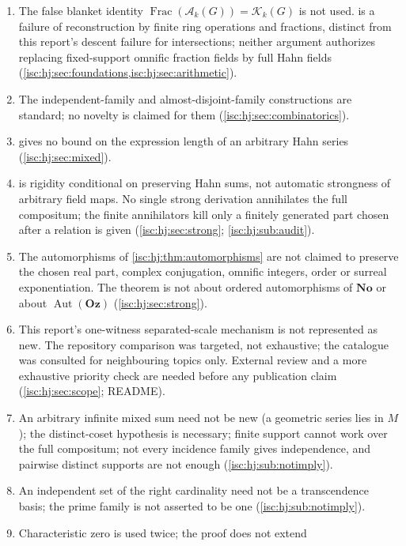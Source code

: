 \documentclass[11pt,letterpaper]{article}
\theoremstyle{definition}
\theoremstyle{remark}
\newcommand{\No}{\mathbf{No}}
\newcommand{\Oz}{\mathbf{Oz}}
\newcommand{\K}[2]{\mathcal K_{#1}(#2)}
\newcommand{\A}[2]{\mathcal A_{#1}(#2)}
\newcommand{\Frac}{\operatorname{Frac}}
\numberwithin{equation}{section}
\begin{document}
\begin{enumerate}[label=J\arabic*.,leftmargin=2.6em,itemsep=2pt]
They are not the Berarducci--Mantova derivation and are not assumed to
respect a surreal exponential (\cref{isc:hj:sec:foundations}).
\item The false blanket identity $\Frac(\A{k}{G})=\K{k}{G}$ is not used.
 is a failure of reconstruction by finite ring
operations and fractions, distinct from this report's descent failure for
intersections; neither argument authorizes replacing fixed-support omnific
fraction fields by full Hahn fields (\cref{isc:hj:sec:foundations,isc:hj:sec:arithmetic}).
\item The independent-family and almost-disjoint-family constructions are
standard; no novelty is claimed for them (\cref{isc:hj:sec:combinatorics}).
\item {} gives no bound on the expression
length of an arbitrary Hahn series (\cref{isc:hj:sec:mixed}).
\item {} is rigidity conditional on
preserving Hahn sums, not automatic strongness of arbitrary field maps. No
single strong derivation annihilates the full compositum; the finite
annihilators kill only a finitely generated part chosen after a relation is
given (\cref{isc:hj:sec:strong}; \cref{isc:hj:sub:audit}).
\item The automorphisms of \cref{isc:hj:thm:automorphisms} are not claimed
to preserve the chosen real part, complex conjugation, omnific integers,
order or surreal exponentiation. The theorem is not about ordered
automorphisms of $\No$ or about $\operatorname{Aut}(\Oz)$
(\cref{isc:hj:sec:strong}).
\item This report's one-witness separated-scale mechanism is not
represented as new. The repository comparison was targeted, not
exhaustive; the catalogue was consulted for neighbouring topics only.
External review and a more exhaustive priority check are needed before any
publication claim (\cref{isc:hj:sec:scope}; README).
\item An arbitrary infinite mixed sum need not be new (a geometric series
lies in $M$); the distinct-coset hypothesis is necessary; finite support
cannot work over the full compositum; not every incidence family gives
independence, and pairwise distinct supports are not enough
(\cref{isc:hj:sub:notimply}).
\item An independent set of the right cardinality need not be a
transcendence basis; the prime family is not asserted to be one
(\cref{isc:hj:sub:notimply}).
\item Characteristic zero is used twice; the proof does not extend

\end{enumerate}
\end{document}
